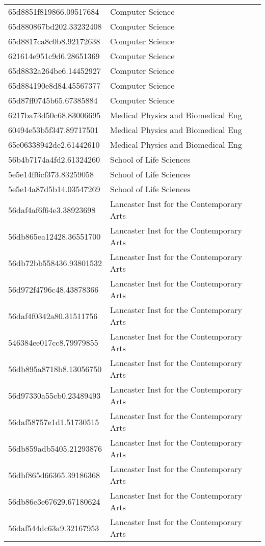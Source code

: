 \begin{tabular}{ll}
65d8851f819866.09517684 & Computer Science \\
65d880867bd202.33232408 & Computer Science \\
65d8817ca8c0b8.92172638 & Computer Science \\
621614e951c9d6.28651369 & Computer Science \\
65d8832a264be6.14452927 & Computer Science \\
65d884190e8d84.45567377 & Computer Science \\
65d87ff0745b65.67385884 & Computer Science \\
6217ba73d50c68.83006695 & Medical Physics and Biomedical Eng \\
60494e53b5f347.89717501 & Medical Physics and Biomedical Eng \\
65e06338942de2.61442610 & Medical Physics and Biomedical Eng \\
56b4b7174a4fd2.61324260 & School of Life Sciences \\
5e5e14ff6cf373.83259058 & School of Life Sciences \\
5e5e14a87d5b14.03547269 & School of Life Sciences \\
56daf4af6f64e3.38923698 & Lancaster Inst for the Contemporary Arts \\
56db865ea12428.36551700 & Lancaster Inst for the Contemporary Arts \\
56db72bb558436.93801532 & Lancaster Inst for the Contemporary Arts \\
56d972f4796c48.43878366 & Lancaster Inst for the Contemporary Arts \\
56daf4f0342a80.31511756 & Lancaster Inst for the Contemporary Arts \\
546384ee017cc8.79979855 & Lancaster Inst for the Contemporary Arts \\
56db895a8718b8.13056750 & Lancaster Inst for the Contemporary Arts \\
56d97330a55cb0.23489493 & Lancaster Inst for the Contemporary Arts \\
56daf58757e1d1.51730515 & Lancaster Inst for the Contemporary Arts \\
56db859adb5405.21293876 & Lancaster Inst for the Contemporary Arts \\
56dbf865d66365.39186368 & Lancaster Inst for the Contemporary Arts \\
56db86e3e67629.67180624 & Lancaster Inst for the Contemporary Arts \\
56daf544dc63a9.32167953 & Lancaster Inst for the Contemporary Arts \\

\end{tabular}
